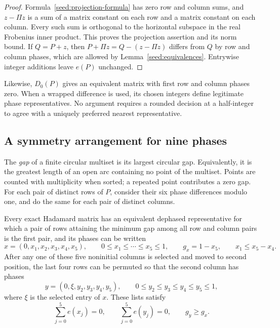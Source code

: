 \begin{proof}
Formula~\eqref{seed:projection-formula} has zero row and column sums, and
$z-\Pi z$ is a sum of a matrix constant on each row and a matrix constant
on each column.  Every such sum is orthogonal to the horizontal subspace
in the real Frobenius inner product.  This proves the projection assertion
and its norm bound.  If $Q=P+z$, then
$P+\Pi z=Q-(z-\Pi z)$ differs from $Q$ by row and column phases, which are
allowed by Lemma~\ref{seed:equivalences}.  Entrywise integer additions
leave $e(P)$ unchanged.
\end{proof}

Likewise, $D_0(P)$ gives an equivalent matrix with first row and column
phases zero.  When a wrapped difference is used, its chosen integers define
legitimate phase representatives.  No argument requires a rounded decision
at a half-integer to agree with a uniquely preferred nearest representative.

\subsection{A symmetry arrangement for nine phases}

The \emph{gap} of a finite circular multiset is its largest circular gap.
Equivalently, it is the greatest length of an open arc containing no point
of the multiset.  Points are counted with multiplicity when sorted; a
repeated point contributes a zero gap.  For each pair of distinct rows
of $P$, consider their six phase differences modulo one, and do the same
for each pair of distinct columns.

\begin{lemma}
\label{seed:arrangement}
Every exact Hadamard matrix has an equivalent dephased representative for
which a pair of rows attaining the minimum gap among all row and column
pairs is the first pair, and its phases can be written
\begin{equation}
\label{seed:x-arrangement}
 x=(0,x_1,x_2,x_3,x_4,x_5),\qquad
 0\le x_1\le\cdots\le x_5\le1,\qquad
 g_x=1-x_5,\qquad x_1\le x_5-x_4.
\end{equation}
After any one of these five noninitial columns is selected and moved to
second position, the last four rows can be permuted so that the second
column has phases
\begin{equation}
\label{seed:y-arrangement}
 y=(0,\xi,y_2,y_3,y_4,y_5),\qquad
 0\le y_2\le y_3\le y_4\le y_5\le1,
\end{equation}
where $\xi$ is the selected entry of $x$.  These lists satisfy
\begin{equation}
\label{seed:local-conditions}
 \sum_{j=0}^5 e(x_j)=0,\qquad
 \sum_{j=0}^5 e(y_j)=0,\qquad g_y\ge g_x.
\end{equation}
\end{lemma}

